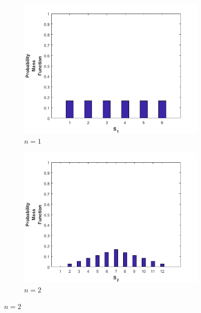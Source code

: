 \documentclass[11pt]{article}
\theoremstyle{definition}
\theoremstyle{lemma}
\theoremstyle{remark}
\begin{document}
	\begin{figure}[h!]
		\centering
		\begin{subfigure}[h!]{0.48\textwidth}
			\includegraphics[width=\textwidth]{./Images/7/1.png}
			\caption{ $n=1$ }
		\end{subfigure}
		\quad
		\begin{subfigure}[h!]{0.48\textwidth}
			\includegraphics[width=\textwidth]{./Images/7/2.png}
			\caption{ $n=2$ }
		\end{subfigure}
		

\end{figure}
\end{document}
